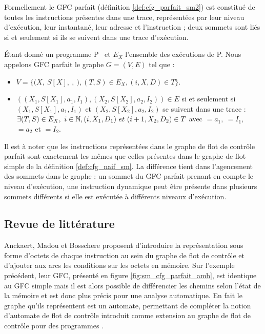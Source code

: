 Formellement le GFC parfait (définition \ref{def:cfg_parfait_sm2}) est constitué de toutes les instructions présentes dans une trace, représentées par leur niveau d'exécution, leur instantané, leur adresse et l'instruction ; deux sommets sont liés si et seulement si ils se suivent dans une trace d'exécution.

\begin{defi}
 Étant donné un programme P \sm\ et $E_X$ l'ensemble des exécutions de P.
 Nous appelons GFC parfait le graphe $G=(V, E)$ tel que :
 \begin{itemize}
  \item $V=\{(X,\ S[X],\ $$,\ $$), (T, S)\in E_X, (i, X, D)\in T\}$.%
  \item $((X_1, S[X_1], a_1, I_1), (X_2, S[X_2], a_2, I_2))\in E$ si et seulement si $(X_1, S[X_1], a_1,
I_1)$ et $(X_2, S[X_2], a_2, I_2)$ se suivent dans une trace : $\exists (T, S)\in
E_X,\ i\in \mathbb N, (i, X_1, D_1)\ et\ (i+1, X_2, D_2)\in T$ avec $=a_1,\ $$=I_1,$~$=a_2$ et $=I_2$.
 \end{itemize}
\label{def:cfg_parfait_sm2}
\end{defi}

Il est à noter que les instructions représentées dans le graphe de flot de contrôle parfait sont exactement les mêmes que celles présentes dans le graphe de flot simple de la définition \ref{def:cfg_naif_sm}.
La différence tient dans l'agencement des sommets dans le graphe : un sommet du GFC parfait prenant en compte le niveau d'exécution, une instruction dynamique peut être présente dans plusieurs sommets différents si elle est exécutée à différents niveaux d'exécution.

\FloatBarrier
\subsection{Revue de littérature}
Anckaert, Madou et Bosschere \cite{AMB06} proposent d'introduire la représentation sous forme d'octets de chaque instruction au sein du graphe de flot de contrôle et d'ajouter aux arcs les conditions sur les octets en mémoire. Sur l'exemple précédent, leur GFC, présenté en figure \ref{fig:sm_cfg_parfait_amb}, est identique au GFC simple mais il est alors possible de différencier les chemins selon l'état de la mémoire et est donc plus précis pour une analyse automatique.
En fait le graphe qu'ils représentent est un automate, permettant de compléter la notion d'automate de flot de contrôle introduit comme extension au graphe de flot de contrôle \cite{HJMS02} pour des programmes \sms.

